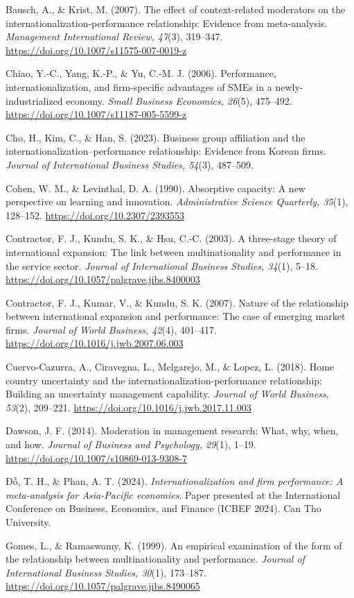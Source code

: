 \documentclass[12pt,a4paper]{article}
\begin{document}
Bausch, A., \& Krist, M. (2007). The effect of context-related
moderators on the internationalization-performance relationship:
Evidence from meta-analysis. \emph{Management International Review,
47}(3), 319--347. \url{https://doi.org/10.1007/s11575-007-0019-z}

Chiao, Y.-C., Yang, K.-P., \& Yu, C.-M. J. (2006). Performance,
internationalization, and firm-specific advantages of SMEs in a
newly-industrialized economy. \emph{Small Business Economics, 26}(5),
475--492. \url{https://doi.org/10.1007/s11187-005-5599-z}

Cho, H., Kim, C., \& Han, S. (2023). Business group affiliation and the
internationalization--performance relationship: Evidence from Korean
firms. \emph{Journal of International Business Studies, 54}(3),
487--509.

Cohen, W. M., \& Levinthal, D. A. (1990). Absorptive capacity: A new
perspective on learning and innovation. \emph{Administrative Science
Quarterly, 35}(1), 128--152. \url{https://doi.org/10.2307/2393553}

Contractor, F. J., Kundu, S. K., \& Hsu, C.-C. (2003). A three-stage
theory of international expansion: The link between multinationality and
performance in the service sector. \emph{Journal of International
Business Studies, 34}(1), 5--18.
\url{https://doi.org/10.1057/palgrave.jibs.8400003}

Contractor, F. J., Kumar, V., \& Kundu, S. K. (2007). Nature of the
relationship between international expansion and performance: The case
of emerging market firms. \emph{Journal of World Business, 42}(4),
401--417. \url{https://doi.org/10.1016/j.jwb.2007.06.003}

Cuervo-Cazurra, A., Ciravegna, L., Melgarejo, M., \& Lopez, L. (2018).
Home country uncertainty and the internationalization-performance
relationship: Building an uncertainty management capability.
\emph{Journal of World Business, 53}(2), 209--221.
\url{https://doi.org/10.1016/j.jwb.2017.11.003}

Dawson, J. F. (2014). Moderation in management research: What, why,
when, and how. \emph{Journal of Business and Psychology, 29}(1), 1--19.
\url{https://doi.org/10.1007/s10869-013-9308-7}

Đỗ, T. H., \& Phan, A. T. (2024). \emph{Internationalization and firm
performance: A meta-analysis for Asia-Pacific economies}. Paper
presented at the International Conference on Business, Economics, and
Finance (ICBEF 2024). Can Tho University.

Gomes, L., \& Ramaswamy, K. (1999). An empirical examination of the form
of the relationship between multinationality and performance.
\emph{Journal of International Business Studies, 30}(1), 173--187.
\url{https://doi.org/10.1057/palgrave.jibs.8490065}
\end{document}

